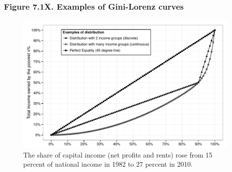 \documentclass[t]{beamer}\usepackage[]{graphicx}\usepackage[]{color}
\newenvironment{knitrout}{}{} %
\begin{document}
\begin{frame}[label=Figure_7_1X]
\frametitle{Figure 7.1X. Examples of Gini-Lorenz curves}
\begin{figure}[t]
\begin{minipage}[b]{\textwidth}
\centering
\begin{knitrout}\footnotesize
{}\color{fgcolor}

{\centering \includegraphics[width=1\linewidth]{figures/bw/Figure_7_1X} 

}



\end{knitrout}
\caption{The share of capital income (net profits and rents) rose from 15 percent of national income in 1982 to 27 percent in 2010.}
\end{minipage}
\end{figure}
\end{frame}
\end{document}

